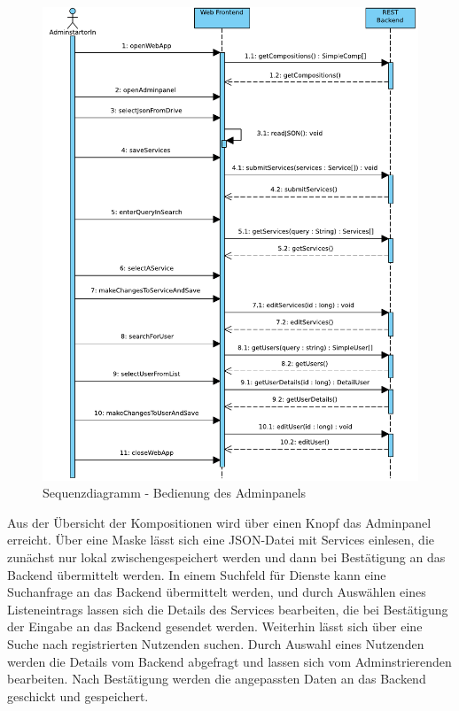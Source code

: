\begin{figure}[h]
	\centering
	\includegraphics[width=.75\textwidth]{img/Diagramme/Sequenz/Frontend_admin}			
	\caption{Sequenzdiagramm - Bedienung des Adminpanels}
	\label{fig:sequenz-adminPanel}
\end{figure}
\noindent
Aus der Übersicht der Kompositionen wird über einen Knopf das Adminpanel erreicht. Über eine Maske lässt sich eine JSON-Datei mit Services einlesen, die zunächst nur lokal zwischengespeichert werden und dann bei Bestätigung an das Backend übermittelt werden. In einem Suchfeld für Dienste kann eine Suchanfrage an das Backend übermittelt werden, und durch Auswählen eines Listeneintrags lassen sich die Details des Services bearbeiten, die bei Bestätigung der Eingabe an das Backend gesendet werden. Weiterhin lässt sich über eine Suche nach registrierten Nutzenden suchen. Durch Auswahl eines Nutzenden werden die Details vom Backend abgefragt und lassen sich vom Adminstrierenden bearbeiten. Nach Bestätigung werden die angepassten Daten an das Backend geschickt und gespeichert.
